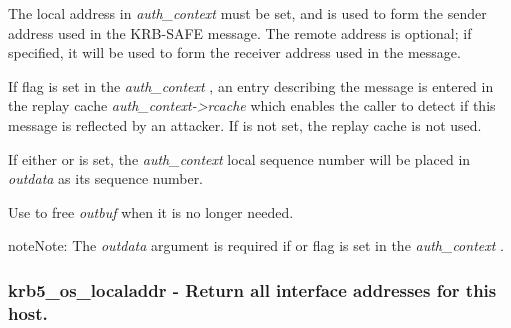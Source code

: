 \documentclass[letterpaper,10pt,english]{sphinxmanual}
\begin{document}
The local address in \emph{auth\_context} must be set, and is used to form the sender address used in the KRB-SAFE message. The remote address is optional; if specified, it will be used to form the receiver address used in the message.

If {\hyperref[appdev/refs/macros/KRB5_AUTH_CONTEXT_DO_TIME:KRB5_AUTH_CONTEXT_DO_TIME]{}} flag is set in the \emph{auth\_context} , an entry describing the message is entered in the replay cache \emph{auth\_context-\textgreater{}rcache} which enables the caller to detect if this message is reflected by an attacker. If {\hyperref[appdev/refs/macros/KRB5_AUTH_CONTEXT_DO_TIME:KRB5_AUTH_CONTEXT_DO_TIME]{}} is not set, the replay cache is not used.

If either {\hyperref[appdev/refs/macros/KRB5_AUTH_CONTEXT_DO_SEQUENCE:KRB5_AUTH_CONTEXT_DO_SEQUENCE]{}} or {\hyperref[appdev/refs/macros/KRB5_AUTH_CONTEXT_RET_SEQUENCE:KRB5_AUTH_CONTEXT_RET_SEQUENCE]{}} is set, the \emph{auth\_context} local sequence number will be placed in \emph{outdata} as its sequence number.

Use {\hyperref[appdev/refs/api/krb5_free_data_contents:krb5_free_data_contents]{}} to free \emph{outbuf} when it is no longer needed.

\begin{notice}{note}{Note:}
The \emph{outdata} argument is required if {\hyperref[appdev/refs/macros/KRB5_AUTH_CONTEXT_RET_TIME:KRB5_AUTH_CONTEXT_RET_TIME]{}} or {\hyperref[appdev/refs/macros/KRB5_AUTH_CONTEXT_RET_SEQUENCE:KRB5_AUTH_CONTEXT_RET_SEQUENCE]{}} flag is set in the \emph{auth\_context} .
\end{notice}


\subsubsection{krb5\_os\_localaddr -  Return all interface addresses for this host.}
\label{appdev/refs/api/krb5_os_localaddr:krb5-os-localaddr-return-all-interface-addresses-for-this-host}\label{appdev/refs/api/krb5_os_localaddr::doc}

\begin{fulllineitems}
\label{appdev/refs/api/krb5_os_localaddr:krb5_os_localaddr}
\end{fulllineitems}
\end{document}
